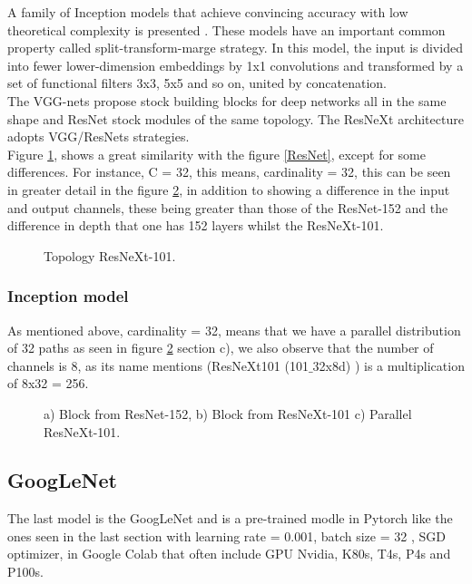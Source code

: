 \documentclass[letterpaper,12pt,openright,oneside]{article}
\begin{document}
A family of Inception models that achieve convincing accuracy with low theoretical complexity is presented \cite{szegedy2016inceptionv4}  \cite{szegedy2014going} \cite{szegedy2015rethinking}. These models have an important common property called split-transform-marge strategy. In this model, the input is divided into fewer lower-dimension embeddings by 1x1 convolutions and transformed by a set of functional filters 3x3, 5x5 and so on, united by concatenation.\\

The VGG-nets \cite{simonyan2015deep} propose stock building blocks for deep networks all in the same shape and ResNet \cite{he2015deep} stock modules of the same topology. The ResNeXt architecture adopts VGG/ResNets strategies.\\

Figure \ref{fig 93}, shows a great similarity with the figure \ref{ResNet}, except for some differences. For instance, C = 32, this means, cardinality = 32, this can be seen in greater detail in the figure \ref{fig 94}, in addition to showing a difference in the input and output channels, these being greater than those of the ResNet-152 and the difference in depth that one has 152 layers whilst the ResNeXt-101.

\begin{figure}[H]
\centerline{}
\caption{Topology ResNeXt-101.}
\label{fig 93}
\end{figure}

\subsubsection{Inception model}
As mentioned above, cardinality = 32, means that we have a parallel distribution of 32 paths as seen in figure \ref{fig 94} section c), we also observe that the number of channels is 8, as its name mentions (ResNeXt101 (101$\_$32x8d) ) is a multiplication of 8x32 = 256.

\begin{figure}[H]
\centerline{}
\caption{a) Block from ResNet-152, b) Block from ResNeXt-101 c) Parallel ResNeXt-101.}
\label{fig 94}
\end{figure}

\subsection{GoogLeNet}
The last model is the GoogLeNet \cite{szegedy2014going} and is a  pre-trained modle in Pytorch like the ones seen in the last section with learning rate =  0.001, batch size = 32 , SGD optimizer,  in Google Colab that often include GPU Nvidia, K80s, T4s, P4s and P100s.\\
\end{document}
